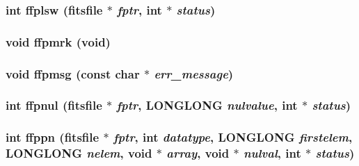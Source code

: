 \subsubsection{\setlength{\rightskip}{0pt plus 5cm}int ffplsw (\bf{fitsfile} $\ast$ {\em fptr}, int $\ast$ {\em status})}\label{test_2shm__client_2fitsio_8h_961af8c215ce5bb2d2d74ba7d5b02591}


\subsubsection{\setlength{\rightskip}{0pt plus 5cm}void ffpmrk (void)}\label{test_2shm__client_2fitsio_8h_b9700796363d20498ceec03ad6c3b976}


\subsubsection{\setlength{\rightskip}{0pt plus 5cm}void ffpmsg (const char $\ast$ {\em err\_\-message})}\label{test_2shm__client_2fitsio_8h_9db26b27c3c6d7589c44565df739c3d5}


\subsubsection{\setlength{\rightskip}{0pt plus 5cm}int ffpnul (\bf{fitsfile} $\ast$ {\em fptr}, \bf{LONGLONG} {\em nulvalue}, int $\ast$ {\em status})}\label{test_2shm__client_2fitsio_8h_611f557254bffac18cb113388849944a}


\subsubsection{\setlength{\rightskip}{0pt plus 5cm}int ffppn (\bf{fitsfile} $\ast$ {\em fptr}, int {\em datatype}, \bf{LONGLONG} {\em firstelem}, \bf{LONGLONG} {\em nelem}, void $\ast$ {\em array}, void $\ast$ {\em nulval}, int $\ast$ {\em status})}\label{test_2shm__client_2fitsio_8h_03027451cf6719b0ff4ffb8c6659b2a2}


